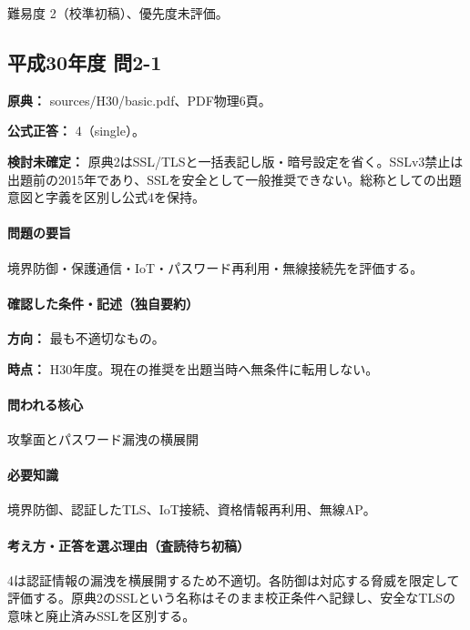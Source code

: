 \par 難易度 2（校準初稿）、優先度未評価。

\subsection{平成30年度 問2-1}
\label{q:h30-reg-basic-2-1}

\noindent\textbf{原典：} sources/H30/basic.pdf、PDF物理6頁。

\textbf{公式正答：} 4（single）。

\par\textbf{検討未確定：} 原典2はSSL/TLSと一括表記し版・暗号設定を省く。SSLv3禁止は出題前の2015年であり、SSLを安全として一般推奨できない。総称としての出題意図と字義を区別し公式4を保持。

\paragraph{問題の要旨} 境界防御・保護通信・IoT・パスワード再利用・無線接続先を評価する。

\paragraph{確認した条件・記述（独自要約）}\mbox{}\par

\noindent\textbf{方向：} 最も不適切なもの。\par

\noindent\textbf{時点：} H30年度。現在の推奨を出題当時へ無条件に転用しない。\par

\paragraph{問われる核心} 攻撃面とパスワード漏洩の横展開

\paragraph{必要知識} 境界防御、認証したTLS、IoT接続、資格情報再利用、無線AP。

\paragraph{考え方・正答を選ぶ理由（査読待ち初稿）} 4は認証情報の漏洩を横展開するため不適切。各防御は対応する脅威を限定して評価する。原典2のSSLという名称はそのまま校正条件へ記録し、安全なTLSの意味と廃止済みSSLを区別する。

